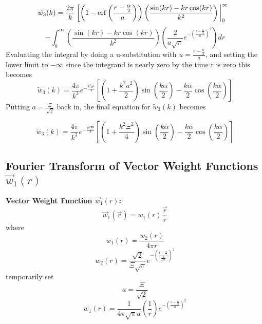 \documentclass[letterpaper,twocolumn,amsmath,amssymb,prb]{revtex4-1}
\begin{document}
\begin{widetext}
\begin{equation}{\widetilde{w}_3(k)=\frac{2\pi}{k}\left[\left(1-\operatorname{erf}\left(\frac{r-\frac{\alpha}{2}}{a}\right)\right)\left(\frac{\sin(kr)-kr\cos(kr)}{k^2}\right)\bigg|^{\infty}_0\color{white}\right]}\end{equation} \color{black}
\begin{displaymath}{-\int_{0}^{\infty}\left(\frac{\sin(kr)-kr\cos(kr)}{k^2}\right)\left(\frac{2}{a\sqrt{\pi}}e^{-\left(\frac{r-\frac{\alpha}{2}}{a}\right)^2}\right)d{r}}\end{displaymath}
Evaluating the integral by doing a u-substitution with $u=\frac{r-\frac{\alpha}{2}}{a}$, and setting the lower limit to $-\infty$  since the integrand is nearly zero by the time r is zero this becomes
\begin{equation}{\widetilde{w}_3(k)=\frac{4\pi}{k^3}e^{-\frac{k^2a^2}{4}}\left[\left(1+\frac{k^2a^2}{2}\right)\sin\left(\frac{k\alpha}{2}\right)-\frac{k\alpha}{2}\cos\left(\frac{k\alpha}{2}\right)\right]}\end{equation}
Putting $a=\frac{\Xi}{\sqrt{2}}$ back in, the final equation for $\widetilde{w}_3(k)$ becomes

\begin{equation}
    \widetilde{w}_3(k)=\frac{4\pi}{k^3}
    e^{-\frac{k^2\Xi^2}{8}}
    \left[\left(1+\frac{k^2\Xi^2}{4}\right)\sin\left(\frac{k\alpha}{2}\right)
      -\frac{k\alpha}{2}\cos\left(\frac{k\alpha}{2}\right)\right]
\end{equation}
\[{}\]

\subsection{Fourier Transform of Vector Weight Functions $\vec{w}_{1}(r)$}
\noindent\textbf{Vector Weight Function $\vec{w}_1(r)$:}
\begin{equation}{\vec{w}_1(\vec{r})=w_1(r)\frac{\vec{r}}{r}}\end{equation}
where
\begin{equation}{w_1(r)=\frac{w_2(r)}{4{\pi}r}}\end{equation}
\begin{equation}{w_2(r)=\frac{\sqrt{2}}{\Xi\sqrt{\pi}}e^{-\left(\frac{r-\frac{\alpha}{2}}{\frac{\Xi}{\sqrt{2}}}\right)^2}}\end{equation}
temporarily set 
\begin{equation}{a=\frac{\Xi}{\sqrt{2}}}\end{equation}
\begin{equation}{w_1(r)=\frac{1}{4{\pi}\sqrt{\pi}a}\left(\frac{1}{r}\right)e^{-\left(\frac{r-\frac{\alpha}{2}}{a}\right)^2}}\end{equation}


\end{widetext}
\end{document}
